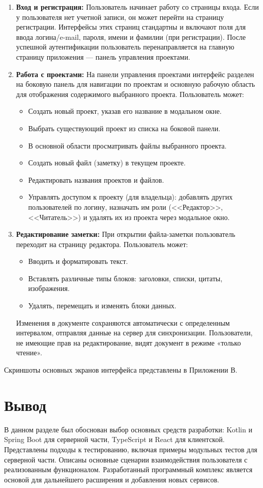 \begin{enumerate}
    \item \textbf{Вход и регистрация:}
    Пользователь начинает работу со страницы входа. Если у пользователя нет учетной записи, он может перейти на страницу регистрации. Интерфейсы этих страниц стандартны и включают поля для ввода логина/e-mail, пароля, имени и фамилии (при регистрации). После успешной аутентификации пользователь перенаправляется на главную страницу приложения — панель управления проектами.
    \item \textbf{Работа с проектами:}
    На панели управления проектами интерфейс разделен на боковую панель для навигации по проектам и основную рабочую область для отображения содержимого выбранного проекта.
    Пользователь может:
    \begin{itemize}
        \item Создать новый проект, указав его название в модальном окне.
        \item Выбрать существующий проект из списка на боковой панели.
        \item В основной области просматривать файлы выбранного проекта.
        \item Создать новый файл (заметку) в текущем проекте.
        \item Редактировать названия проектов и файлов.
        \item Управлять доступом к проекту (для владельца): добавлять других пользователей по логину, назначать им роли (<<Редактор>>, <<Читатель>>) и удалять их из проекта через модальное окно.
    \end{itemize}
    \item \textbf{Редактирование заметки:}
    При открытии файла-заметки пользователь переходит на страницу редактора. Пользователь может:
    \begin{itemize}
        \item Вводить и форматировать текст.
        \item Вставлять различные типы блоков: заголовки, списки, цитаты, изображения.
        \item Удалять, перемещать и изменять блоки данных.
    \end{itemize}
    Изменения в документе сохраняются автоматически с определенным интервалом, отправляя данные на сервер для синхронизации. Пользователи, не имеющие прав на редактирование, видят документ в режиме «только чтение».
\end{enumerate}
Скриншоты основных экранов интерфейса представлены в Приложении В.

\section*{Вывод}

В данном разделе был обоснован выбор основных средств разработки: Kotlin и Spring Boot для серверной части, TypeScript и React для клиентской. 
Представлены подходы к тестированию, включая примеры модульных тестов для серверной части. 
Описаны основные сценарии взаимодействия пользователя с реализованным функционалом.
Разработанный программный комплекс является основой для дальнейшего расширения и добавления новых сервисов.
